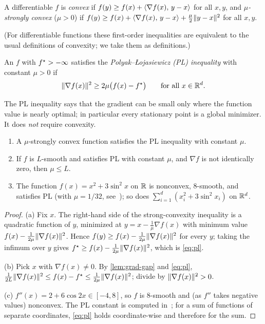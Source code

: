 \begin{definition}\label{def:convex}
A differentiable $f$ is \emph{convex} if $f(y)\ge f(x)+\langle \nabla f(x),\, y-x\rangle$ for all
$x,y$, and \emph{$\mu$-strongly convex} ($\mu>0$) if
$f(y)\ge f(x)+\langle \nabla f(x),\, y-x\rangle+\frac\mu2\lVert y-x\rVert^2$ for all $x,y$.
\end{definition}

(For differentiable functions these first-order inequalities are equivalent to the usual
definitions of convexity; we take them as definitions.)

\begin{definition}[PL inequality]\label{def:pl}
An $f$ with $f^\star>-\infty$ satisfies the \emph{Polyak--{\L}ojasiewicz (PL) inequality} with
constant $\mu>0$ if
\begin{equation}\label{eq:pl}
  \lVert \nabla f(x)\rVert^2\ge2\mu\bigl(f(x)-f^\star\bigr)\qquad\text{for all }x\in\mathbb{R}^d.
\end{equation}
\end{definition}

The PL inequality says that the gradient can be small only where the function value is
nearly optimal; in particular every stationary point is a global minimizer. It does
\emph{not} require convexity.

\begin{lemma}\label{lem:pl-facts}
\begin{enumerate}[label=\textup{(\alph*)}]
\item A $\mu$-strongly convex function satisfies the PL inequality with constant $\mu$.
\item If $f$ is $L$-smooth and satisfies PL with constant $\mu$, and $\nabla f$ is not
      identically zero, then $\mu\le L$.
\item The function $f(x)=x^2+3\sin^2x$ on $\mathbb{R}$ is nonconvex, $8$-smooth, and satisfies PL
      (with $\mu=1/32$, see~\cite{karimi2016}); so does $\sum_{i=1}^d(x_i^2+3\sin^2x_i)$ on $\mathbb{R}^d$.
\end{enumerate}
\end{lemma}

\begin{proof}
(a) Fix $x$. The right-hand side of the strong-convexity inequality is a quadratic
function of $y$, minimized at $y=x-\frac1\mu\nabla f(x)$ with minimum value
$f(x)-\frac{1}{2\mu}\lVert \nabla f(x)\rVert^2$. Hence $f(y)\ge f(x)-\frac1{2\mu}\lVert \nabla
f(x)\rVert^2$ for every $y$; taking the infimum over $y$ gives
$f^\star\ge f(x)-\frac1{2\mu}\lVert \nabla f(x)\rVert^2$, which is \eqref{eq:pl}.

(b) Pick $x$ with $\nabla f(x)\ne0$. By \cref{lem:grad-gap} and \eqref{eq:pl},
$\frac{1}{2L}\lVert \nabla f(x)\rVert^2\le f(x)-f^\star\le\frac1{2\mu}\lVert \nabla f(x)\rVert^2$; divide by
$\lVert \nabla f(x)\rVert^2>0$.

(c) $f''(x)=2+6\cos2x\in[-4,8]$, so $f$ is $8$-smooth and (as $f''$ takes negative values)
nonconvex. The PL constant is computed in~\cite{karimi2016}; for a sum of functions of
separate coordinates, \eqref{eq:pl} holds coordinate-wise and therefore for the sum.
\end{proof}

